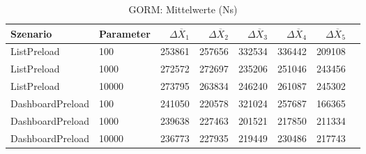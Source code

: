 
\begin{table}[ht]
\setlength{\extrarowheight}{-1pt}
\centering
\caption{GORM: Mittelwerte (Ns)}
\begin{tabular}{llrrrrrr}
\toprule
Szenario & Parameter & ${\Delta \overline{X}_1}$ & ${\Delta \overline{X}_2}$ & ${\Delta \overline{X}_3}$ & ${\Delta \overline{X}_4}$ & ${\Delta \overline{X}_5}$ \\
\midrule
	ListPreload & 100 & 253861 & 257656 & 332534 & 336442 & 209108 \\
	ListPreload & 1000 & 272572 & 272697 & 235206 & 251046 & 243456 \\
	ListPreload & 10000 & 273795 & 263834 & 246240 & 261087 & 245302 \\
	DashboardPreload & 100 & 241050 & 220578 & 321024 & 257687 & 166365 \\
	DashboardPreload & 1000 & 239638 & 227463 & 201521 & 217850 & 211334 \\
	DashboardPreload & 10000 & 236773 & 227935 & 219449 & 230486 & 217743 \\
\bottomrule
\end{tabular}
\label{tab:mittelwerte_gorm_ns}
\end{table}
	